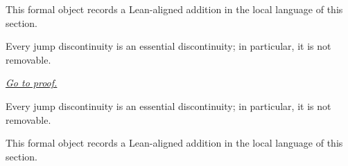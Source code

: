 \begin{remark*}[Interpretation]
This formal object records a Lean-aligned addition in the local language of this section.
\end{remark*}

\begin{dependencies}
\NoLocalDependencies
\end{dependencies}
\begin{theorem}
\label{thm:jump-subset-essential}
Every jump discontinuity is an essential discontinuity; in particular, it is not removable.

\smallskip
\noindent
\hyperref[prf:jump-subset-essential]{\textit{Go to proof.}}
\end{theorem}

\begin{remark*}
Every jump discontinuity is an essential discontinuity; in particular, it is not removable.
\end{remark*}

\begin{remark*}[Interpretation]
This formal object records a Lean-aligned addition in the local language of this section.
\end{remark*}

\begin{dependencies}
\NoLocalDependencies
\end{dependencies}
